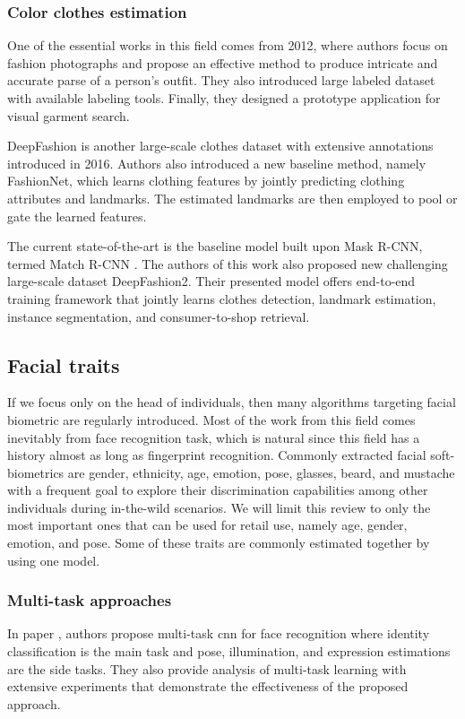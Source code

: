         \subsubsection{Color clothes estimation}
            One of the essential works \cite{yamaguchi2012parsing} in this field comes from 2012, where authors focus on fashion photographs and propose an effective method to produce intricate and accurate parse of a person’s outfit. They also introduced large labeled dataset with available labeling tools. Finally, they designed a prototype application for visual garment search.
            
            DeepFashion \cite{liu2016deepfashion} is another large-scale clothes dataset with extensive annotations introduced in 2016. Authors also introduced a new baseline method, namely FashionNet, which learns clothing features by jointly predicting clothing attributes and landmarks. The estimated landmarks are then employed to pool or gate the learned features. 
            
            The current state-of-the-art is the baseline model built upon Mask R-CNN, termed Match R-CNN \cite{ge2019deepfashion2}. The authors of this work also proposed new challenging large-scale dataset DeepFashion2. Their presented model offers end-to-end training framework that jointly learns clothes detection, landmark estimation, instance segmentation, and consumer-to-shop retrieval. 

    \subsection{Facial traits}
        If we focus only on the head of individuals, then many algorithms targeting facial biometric are regularly introduced. Most of the work from this field comes inevitably from face recognition task, which is natural since this field has a history almost as long as fingerprint recognition. Commonly extracted facial soft-biometrics are gender, ethnicity, age, emotion, pose, glasses, beard, and mustache with a frequent goal to explore their discrimination capabilities among other individuals during in-the-wild scenarios. We will limit this review to only the most important ones that can be used for retail use, namely age, gender, emotion, and pose. Some of these traits are commonly estimated together by using one model.
        
        \subsubsection{Multi-task approaches}
            In paper \cite{yin2018multi}, authors propose multi-task \gls{cnn} for face recognition where identity classification is the main task and pose, illumination, and expression estimations are the side tasks. They also provide analysis of multi-task learning with extensive experiments that demonstrate the effectiveness of the proposed approach.
            
